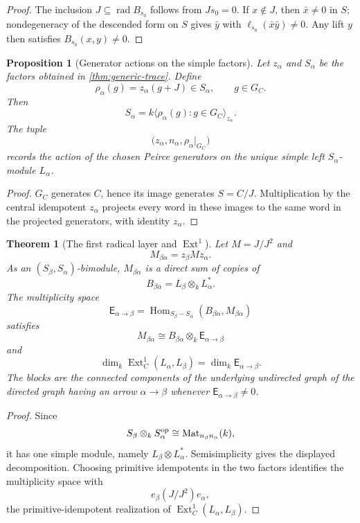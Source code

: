 \documentclass[11pt,reqno]{amsart}
\newtheorem{theorem}{Theorem}[section]
\newtheorem{proposition}[proposition]{Proposition}
\theoremstyle{definition}
\theoremstyle{remark}
\theoremstyle{definition}
\newcommand{\Mat}{\operatorname{Mat}}
\newcommand{\Hom}{\operatorname{Hom}}
\newcommand{\Ext}{\operatorname{Ext}}
\newcommand{\rad}{\operatorname{rad}}
\begin{document}
\begin{proof}
The inclusion $J\subseteq\rad B_{s_0}$ follows from $Js_0=0$.  If
$x\notin J$, then $\bar x\ne0$ in $S$; nondegeneracy of the descended form
on $S$ gives $\bar y$ with $\ell_{s_0}(\bar x\bar y)\ne0$.  Any lift $y$
then satisfies $B_{s_0}(x,y)\ne0$.
\end{proof}

\begin{proposition}[Generator actions on the simple factors]\label{prop:factor-actions}
Let $z_\alpha$ and $S_\alpha$ be the factors obtained in
\cref{thm:generic-trace}.  Define
\[
 \rho_\alpha(g)=z_\alpha(g+J)\in S_\alpha,
 \qquad g\in G_C.
\]
Then
\[
 S_\alpha=k\langle\rho_\alpha(g):g\in G_C\rangle_{z_\alpha}.
\]
The tuple
\[
 \bigl(z_\alpha,n_\alpha,\rho_\alpha|_{G_C}\bigr)
\]
records the action of the chosen Peirce generators on the unique
simple left $S_\alpha$-module $L_\alpha$.
\end{proposition}

\begin{proof}
$G_C$ generates $C$, hence its image generates $S=C/J$.
Multiplication by the central idempotent $z_\alpha$ projects every word in
these images to the same word in the projected generators, with identity
$z_\alpha$.
\end{proof}

\begin{theorem}[The first radical layer and $\Ext^1$]\label{thm:radical-ext}
Let $M=J/J^2$ and
\[
 M_{\beta\alpha}=z_\beta Mz_\alpha.
\]
As an $(S_\beta,S_\alpha)$-bimodule, $M_{\beta\alpha}$ is a direct sum of
copies of
\[
 B_{\beta\alpha}=L_\beta\otimes_kL_\alpha^*.
\]
The multiplicity space
\[
 \mathsf E_{\alpha\to\beta}
 =\Hom_{S_\beta-S_\alpha}
 (B_{\beta\alpha},M_{\beta\alpha})
\]
satisfies
\[
 M_{\beta\alpha}
 \cong B_{\beta\alpha}\otimes_k\mathsf E_{\alpha\to\beta}
\]
and
\[
 \dim_k\Ext_C^1(L_\alpha,L_\beta)
 =\dim_k\mathsf E_{\alpha\to\beta}.
\]
The blocks are the connected components of the underlying undirected graph
of the directed graph having an arrow $\alpha\to\beta$ whenever
$\mathsf E_{\alpha\to\beta}\ne0$.
\end{theorem}

\begin{proof}
Since
\[
 S_\beta\otimes_kS_\alpha^{\rm op}
 \cong\Mat_{n_\beta n_\alpha}(k),
\]
it has one simple module, namely $L_\beta\otimes L_\alpha^*$.
Semisimplicity gives the displayed decomposition.  Choosing primitive
idempotents in the two factors identifies the multiplicity space with
\[
 e_\beta(J/J^2)e_\alpha,
\]
the primitive-idempotent realization of
$\Ext_C^1(L_\alpha,L_\beta)$.
\end{proof}
\end{document}
